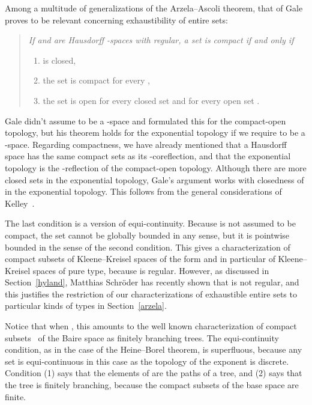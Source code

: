 \documentclass{LMCS}
\begin{document}
Among a multitude of generalizations of the Arzela--Ascoli theorem,
that of Gale~\cite[Theorem 1]{gale} proves to be relevant concerning
exhaustibility of entire sets:
\pagebreak[3]
\begin{quote}
\em
  If  and  are Hausdorff -spaces with  regular, 
a set  is compact 
  if and only if
  \begin{enumerate}
  \item  is closed,
  \item the set  is compact for every ,
  \item the set  is open for every
    closed set  and for every open set .
  \end{enumerate}
\end{quote}
Gale didn't assume  to be a -space and formulated this for the
compact-open topology, but his theorem holds for the exponential
topology if we require  to be a -space.  Regarding compactness,
we have already mentioned that a Hausdorff space has the same compact
sets as its -coreflection, and that the exponential topology is the
-reflection of the compact-open topology. Although there are more
closed sets in the exponential topology, Gale's argument works with
closedness of  in the exponential topology. This follows
from the general considerations of Kelley~\cite[Chapter 7]{kelley}.

The last condition is a version of equi-continuity.  Because  is
not assumed to be compact, the set  cannot be globally bounded in
any sense, but it is pointwise bounded in the sense of the second
condition.  This gives a characterization of compact subsets of
Kleene--Kreisel spaces of the form  and in particular of
Kleene--Kreisel spaces of pure type, because  is regular. However,
as discussed in Section~\ref{hyland}, Matthias Schr\"oder has recently
shown that  is not regular, and this justifies the
restriction of our characterizations of exhaustible entire sets to
particular kinds of types in Section~\ref{arzela}.

Notice that when , this amounts to the well known
characterization of compact subsets~ of the Baire space 
as finitely branching trees. The equi-continuity condition, as in the
case of the Heine--Borel theorem, is superfluous, because any set is
equi-continuous in this case as the topology of the exponent is
discrete. Condition (1) says that the elements of  are the paths of
a tree, and (2) says that the tree is finitely branching, because the
compact subsets of the base space are finite.

\medskip
\end{document}
